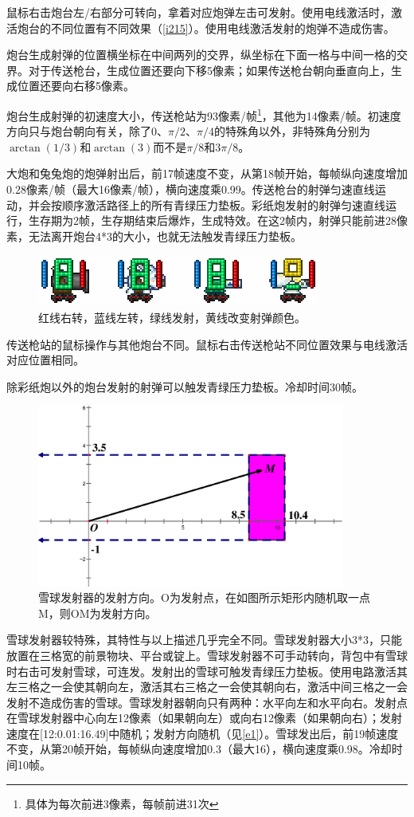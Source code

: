 鼠标右击炮台左/右部分可转向，拿着对应炮弹左击可发射。使用电线激活时，激活炮台的不同位置有不同效果（\autoref{i215}）。使用电线激活发射的炮弹不造成伤害。

炮台生成射弹的位置横坐标在中间两列的交界，纵坐标在下面一格与中间一格的交界。对于传送枪台，生成位置还要向下移5像素；如果传送枪台朝向垂直向上，生成位置还要向右移5像素。

炮台生成射弹的初速度大小，传送枪站为93像素/帧\footnote{具体为每次前进3像素，每帧前进31次}，其他为14像素/帧。初速度方向只与炮台朝向有关，除了0、$\pi/2$、$\pi/4$的特殊角以外，非特殊角分别为$\arctan(1/3)$和$\arctan(3)$而不是$\pi/8$和$3\pi/8$。

大炮和兔兔炮的炮弹射出后，前17帧速度不变，从第18帧开始，每帧纵向速度增加0.28像素/帧（最大16像素/帧），横向速度乘0.99。传送枪台的射弹匀速直线运动，并会按顺序激活路径上的所有青绿压力垫板。彩纸炮发射的射弹匀速直线运行，生存期为2帧，生存期结束后爆炸，生成特效。在这2帧内，射弹只能前进28像素，无法离开炮台4*3的大小，也就无法触发青绿压力垫板。

\begin{figure}[!ht]
\centering
\includegraphics{images/215.png}
\caption{红线右转，蓝线左转，绿线发射，黄线改变射弹颜色。}
\label{i215}
\end{figure}

传送枪站的鼠标操作与其他炮台不同。鼠标右击传送枪站不同位置效果与电线激活对应位置相同。

除彩纸炮以外的炮台发射的射弹可以触发青绿压力垫板。冷却时间30帧。

\begin{figure}[!ht]
\centering
\includegraphics[width=0.9\textwidth]{images/1.eps}
\caption{雪球发射器的发射方向。O为发射点，在如图所示矩形内随机取一点M，则OM为发射方向。}\label{e1}
\end{figure}
雪球发射器较特殊，其特性与以上描述几乎完全不同。雪球发射器大小3*3，只能放置在三格宽的前景物块、平台或锭上。雪球发射器不可手动转向，背包中有雪球时右击可发射雪球，可连发。发射出的雪球可触发青绿压力垫板。使用电路激活其左三格之一会使其朝向左，激活其右三格之一会使其朝向右，激活中间三格之一会发射不造成伤害的雪球。雪球发射器朝向只有两种：水平向左和水平向右。发射点在雪球发射器中心向左12像素（如果朝向左）或向右12像素（如果朝向右）；发射速度在[12:0.01:16.49]中随机；发射方向随机（见\autoref{e1}）。雪球发出后，前19帧速度不变，从第20帧开始，每帧纵向速度增加0.3（最大16），横向速度乘0.98。冷却时间10帧。

